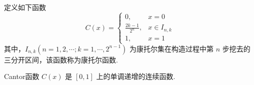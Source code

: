 \documentclass[../../main.tex]{subfiles}
\begin{document}
\begin{definition}[Cantor函数]
定义如下函数
\[
C(x)=
\begin{cases}
0, & x = 0\\
\frac{2k - 1}{2^n}, & x\in I_{n,k}\\
1, & x = 1
\end{cases}
\]
其中，$I_{n,k}(n = 1,2,\cdots;k = 1,\cdots,2^{n - 1})$ 为康托尔集在构造过程中第 $n$ 步挖去的三分开区间，该函数称为康托尔函数.
\end{definition}
\begin{note}
Cantor函数 $C(x)$ 是 $[0,1]$ 上的单调递增的连续函数. 
\end{note}
\end{document}
